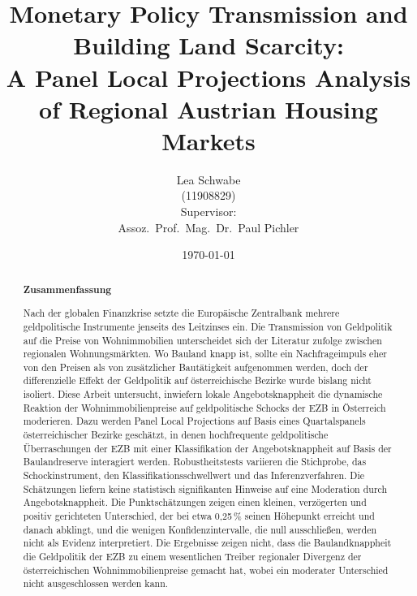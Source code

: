 \documentclass[a4paper,12pt, headsepline]{scrartcl}
\title{Monetary Policy Transmission and Building Land Scarcity:\\ A Panel Local Projections Analysis of Regional Austrian Housing Markets}
\date{\today}
\author{Lea Schwabe\\(11908829)\\[0.47cm]Supervisor:\\Assoz.~Prof.~Mag.~Dr.~Paul Pichler}
\numberwithin{equation}{section}
\begin{document}
\begin{titlingpage}
\maketitle
\end{titlingpage}
\thispagestyle{empty} %
\begin{singlespace}
\begin{otherlanguage}{ngerman}
\small
\begin{abstract}
\begin{center}
	\textbf{Zusammenfassung}
\end{center}
\vspace*{2pt}
Nach der globalen Finanzkrise setzte die Europäische Zentralbank mehrere geldpolitische Instrumente jenseits des Leitzinses ein. Die Transmission von Geldpolitik auf die Preise von Wohnimmobilien unterscheidet sich der Literatur zufolge zwischen regionalen Wohnungsmärkten. Wo Bauland knapp ist, sollte ein Nachfrageimpuls eher von den Preisen als von zusätzlicher Bautätigkeit aufgenommen werden, doch der differenzielle Effekt der Geldpolitik auf österreichische Bezirke wurde bislang nicht isoliert. Diese Arbeit untersucht, inwiefern lokale Angebotsknappheit die dynamische Reaktion der Wohnimmobilienpreise auf geldpolitische Schocks der EZB in Österreich moderieren. Dazu werden Panel Local Projections auf Basis eines Quartalspanels österreichischer Bezirke geschätzt, in denen hochfrequente geldpolitische Überraschungen der EZB mit einer Klassifikation der Angebotsknappheit auf Basis der Baulandreserve interagiert werden. Robustheitstests variieren die Stichprobe, das Schockinstrument, den Klassifikationsschwellwert und das Inferenzverfahren. Die Schätzungen liefern keine statistisch signifikanten Hinweise auf eine Moderation durch Angebotsknappheit. Die Punktschätzungen zeigen einen kleinen, verzögerten und positiv gerichteten Unterschied, der bei etwa 0{,}25\,\% seinen Höhepunkt erreicht und danach abklingt, und die wenigen Konfidenzintervalle, die null ausschließen, werden nicht als Evidenz interpretiert. Die Ergebnisse zeigen nicht, dass die Baulandknappheit die Geldpolitik der EZB zu einem wesentlichen Treiber regionaler Divergenz der österreichischen Wohnimmobilienpreise gemacht hat, wobei ein moderater Unterschied nicht ausgeschlossen werden kann.

\end{abstract}
\end{otherlanguage}
\end{singlespace}
\end{document}
